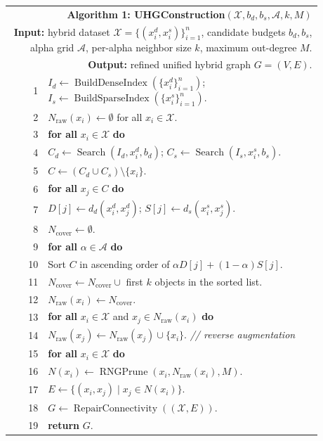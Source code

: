 \begin{center}
\begin{tabular}{r p{0.88\linewidth}}
\hline
\multicolumn{2}{p{0.97\linewidth}}{\textbf{Algorithm 1: UHGConstruction}$(\mathcal{X}, b_d, b_s, \mathcal{A}, k, M)$} \\
\multicolumn{2}{p{0.97\linewidth}}{\textbf{Input:} hybrid dataset $\mathcal{X}=\{(x_i^d,x_i^s)\}_{i=1}^{n}$, candidate budgets $b_d,b_s$, alpha grid $\mathcal{A}$, per-alpha neighbor size $k$, maximum out-degree $M$.} \\
\multicolumn{2}{p{0.97\linewidth}}{\textbf{Output:} refined unified hybrid graph $G=(V,E)$.} \\
\hline
1 & $I_d \leftarrow \operatorname{BuildDenseIndex}(\{x_i^d\}_{i=1}^{n})$; $I_s \leftarrow \operatorname{BuildSparseIndex}(\{x_i^s\}_{i=1}^{n})$. \\
2 & $N_{\mathrm{raw}}(x_i)\leftarrow\emptyset$ for all $x_i\in\mathcal{X}$. \\
3 & \textbf{for all} $x_i\in\mathcal{X}$ \textbf{do} \\
4 & \quad $C_d\leftarrow\operatorname{Search}(I_d,x_i^d,b_d)$; $C_s\leftarrow\operatorname{Search}(I_s,x_i^s,b_s)$. \\
5 & \quad $C\leftarrow(C_d\cup C_s)\setminus\{x_i\}$. \\
6 & \quad \textbf{for all} $x_j\in C$ \textbf{do} \\
7 & \quad\quad $D[j]\leftarrow d_d(x_i^d,x_j^d)$; $S[j]\leftarrow d_s(x_i^s,x_j^s)$. \\
8 & \quad $N_{\mathrm{cover}}\leftarrow\emptyset$. \\
9 & \quad \textbf{for all} $\alpha\in\mathcal{A}$ \textbf{do} \\
10 & \quad\quad Sort $C$ in ascending order of $\alpha D[j]+(1-\alpha)S[j]$. \\
11 & \quad\quad $N_{\mathrm{cover}}\leftarrow N_{\mathrm{cover}}\cup$ first $k$ objects in the sorted list. \\
12 & \quad $N_{\mathrm{raw}}(x_i)\leftarrow N_{\mathrm{cover}}$. \\
13 & \textbf{for all} $x_i\in\mathcal{X}$ and $x_j\in N_{\mathrm{raw}}(x_i)$ \textbf{do} \\
14 & \quad $N_{\mathrm{raw}}(x_j)\leftarrow N_{\mathrm{raw}}(x_j)\cup\{x_i\}$. \hfill \textit{// reverse augmentation} \\
15 & \textbf{for all} $x_i\in\mathcal{X}$ \textbf{do} \\
16 & \quad $N(x_i)\leftarrow\operatorname{RNGPrune}(x_i,N_{\mathrm{raw}}(x_i),M)$. \\
17 & $E\leftarrow\{(x_i,x_j)\mid x_j\in N(x_i)\}$. \\
18 & $G\leftarrow\operatorname{RepairConnectivity}((\mathcal{X},E))$. \\
19 & \textbf{return} $G$. \\
\hline
\end{tabular}
\end{center}

